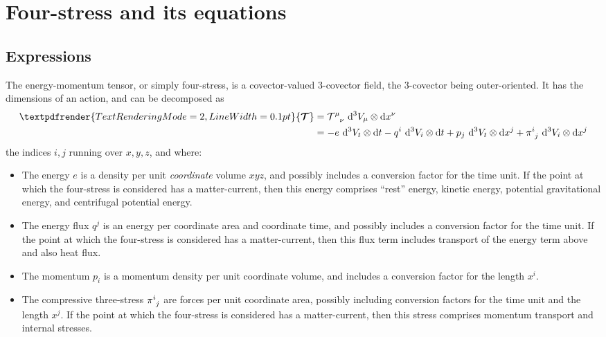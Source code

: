 \documentclass[\ifafour a4paper,12pt,\else a5paper,10pt,\fi%
onecolumn,oneside,article,%
british%
]{memoir}
\theoremstyle{remark}
\theoremstyle{innote}
\renewcommand*{\bm}[1]{\textpdfrender{TextRenderingMode=2,LineWidth=0.1pt}{\boldsymbol{#1}}}
\newcommand*{\di}{\mathop{}\!\mathrm{d}}%
\renewcommand*{\|}[1][]{\nonscript\:#1\vert\nonscript\:\mathopen{}}
\renewcommand*{\i}{{}\indices}
\newcommand*{\si}[1]{\di{#1}}
\newcommand*{\ttti}[1]{\di^{3}V_{#1}}
\newcommand*{\yTT}{\bm{\mathcal{T}}}
\newcommand*{\yT}{\mathcal{T}}
\newcommand*{\ye}{e}
\begin{document}
% 
% 




\section{Four-stress and its equations}
\label{sec:tensor_energy}

\subsection{Expressions}
\label{sec:expressions_4stress}


The energy-momentum tensor, or simply four-stress, is a covector-valued 3-covector field, the 3-covector being outer-oriented. It has the dimensions of an action, and can be decomposed as
\begin{equation}
  \label{eq:decomp_T}
  \begin{split}
    \yTT &= \yT\i{^{\mu}_{\nu}}\,\ttti{\mu}\otimes\si{x^{\nu}}
    \\&=
    -\ye\, \ttti{t}\otimes\si{t} 
    -q^{i}\, \ttti{i}\otimes\si{t} 
    +p_{j}\, \ttti{t}\otimes\si{x^{j}} 
    +\pi\i{^{i}_{j}}\, \ttti{i}\otimes\si{x^{j}}
  \end{split}
\end{equation}
the indices $i,j$ running over $x,y,z$, and where:
\begin{itemize}
\item The energy $\ye$ is a density per unit \emph{coordinate} volume $xyz$, and possibly includes a conversion factor for the time unit. If the point at which the four-stress is considered has a matter-current, then this energy comprises \enquote{rest} energy, kinetic energy, potential gravitational energy, and centrifugal potential energy.
\item The energy flux $q^{j}$ is an energy per coordinate area and coordinate time, and possibly includes a conversion factor for the time unit. If the point at which the four-stress is considered has a matter-current, then this flux term includes transport of the energy term above and also heat flux.
\item The momentum $p_{i}$ is a momentum density per unit coordinate volume, and includes a conversion factor for the length $x^{i}$.
\item The compressive three-stress $\pi\i{^{i}_{j}}$ are forces per unit coordinate area, possibly including conversion factors for the time unit and the length $x^{j}$.  If the point at which the four-stress is considered has a matter-current, then this stress comprises momentum transport and internal stresses.
\end{itemize}
\end{document}
